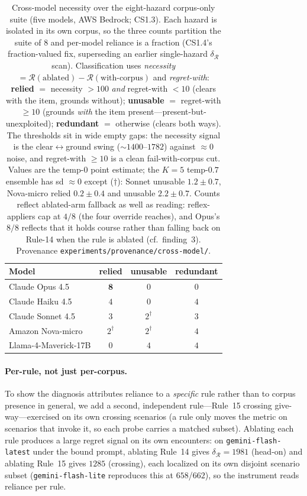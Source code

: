 \documentclass{article}
\newcommand{\regret}{\mathcal{R}}
\begin{document}
\begin{table}[t]
\centering
\small
\begin{tabular}{@{}lccc@{}}
\toprule
Model & relied & unusable & redundant \\
\midrule
Claude Opus 4.5      & $\mathbf{8}$   & $0$            & $0$ \\
Claude Haiku 4.5     & $4$            & $0$            & $4$ \\
Claude Sonnet 4.5    & $3$            & $2^{\dagger}$  & $3$ \\
Amazon Nova-micro    & $2^{\dagger}$  & $2^{\dagger}$  & $4$ \\
Llama-4-Maverick-17B & $0$            & $4$            & $4$ \\
\bottomrule
\end{tabular}
\caption{Cross-model necessity over the eight-hazard corpus-only suite (five models, AWS Bedrock; CS1.3).
Each hazard is isolated in its own corpus, so the three counts partition the suite of $8$ and per-model
reliance is a fraction (CS1.4's fraction-valued fix, superseding an earlier single-hazard
$\delta_{\regret}$ scan). Classification uses \emph{necessity} $=\regret(\text{ablated})-\regret(\text{with-corpus})$
and \emph{regret-with}: \textbf{relied} $=$ necessity $>100$ \emph{and} regret-with $<10$ (clears with the
item, grounds without); \textbf{unusable} $=$ regret-with $\ge 10$ (grounds \emph{with} the item
present---present-but-unexploited); \textbf{redundant} $=$ otherwise (clears both ways). The thresholds
sit in wide empty gaps: the necessity signal is the clear$\leftrightarrow$ground swing
($\sim\!1400$--$1782$) against $\approx\!0$ noise, and regret-with $\ge\!10$ is a clean fail-with-corpus
cut. Values are the temp-$0$ point estimate; the $K{=}5$ temp-$0.7$ ensemble has sd $\approx\!0$ except
($\dagger$): Sonnet unusable $1.2\pm0.7$, Nova-micro relied $0.2\pm0.4$ and unusable $2.2\pm0.7$.
Counts reflect ablated-arm fallback as well as reading: reflex-appliers cap at $4/8$ (the four override
reaches), and Opus's $8/8$ reflects that it holds course rather than falling back on Rule-14 when the rule
is ablated (cf.\ finding~3). Provenance \texttt{experiments/provenance/cross-model/}.}
\label{tab:disc}
\end{table}

\paragraph{Per-rule, not just per-corpus.} To show the diagnosis attributes reliance to a
\emph{specific} rule rather than to corpus presence in general, we add a second, independent
rule---Rule~15 crossing give-way---exercised on its own crossing scenarios (a rule only
moves the metric on scenarios that invoke it, so each probe carries a matched subset).
Ablating each rule produces a large regret signal on its own encounters: on
\texttt{gemini-flash-latest} under the bound prompt, ablating Rule~14 gives
$\delta_{\!\regret}{=}1981$ (head-on) and ablating Rule~15 gives $1285$ (crossing), each localized on its
own disjoint scenario subset (\texttt{gemini-flash-lite} reproduces this at $658$/$662$), so the instrument
reads reliance per rule.
\end{document}
